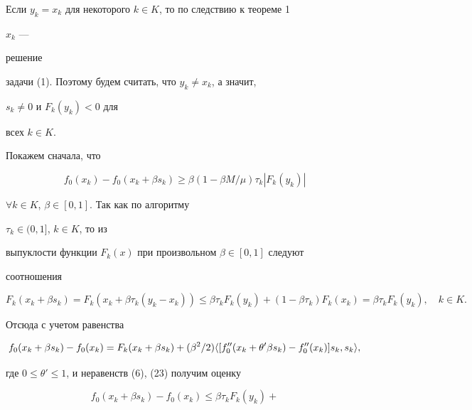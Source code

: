 \begin{pf}


Если $y_k=x_k$ для некоторого $k\in K$, то по следствию к теореме 1


$x_k$ ---


решение


задачи (1). Поэтому будем считать, что $y_k\ne x_k$, а значит,


$s_k\ne 0$ и $F_k(y_k)<0$ для


всех $k\in K$.





Покажем сначала, что


\begin{equation}


f_0(x_k)-f_0(x_k+\beta s_k)\ge \beta(1-\beta M/\mu)\tau_k


|F_k(y_k)|


\end{equation}


$\forall k\in K$, $\beta\in[0,1]$. Так как по алгоритму


$\tau_k\in(0,1]$, $k\in K$, то из


выпуклости функции $F_k(x)$ при произвольном $\beta\in[0,1]$ следуют


соотношения


\begin{equation}


F_k(x_k+\beta s_k)=F_k(x_k+\beta\tau_k(y_k-x_k))\le


\beta\tau_kF_k(y_k)+(1-\beta\tau_k)F_k(x_k)=


\beta\tau_kF_k(y_k),\quad k\in K.


\end{equation}


Отсюда с учетом равенства


\begin{equation}


f_0(x_k+\beta s_k)-f_0(x_k)=F_k(x_k+\beta s_k)+


(\beta^2/2)\la[f''_0(x_k+\theta'\beta s_k)-


f''_0(x_k)]s_k,s_k\ra,


\end{equation}


где $0\le\theta'\le 1$, и неравенств (6), (23) получим оценку


\begin{equation}


f_0(x_k+\beta s_k)-f_0(x_k)\le\beta\tau_kF_k(y_k)+



\end{equation}
\end{pf}
